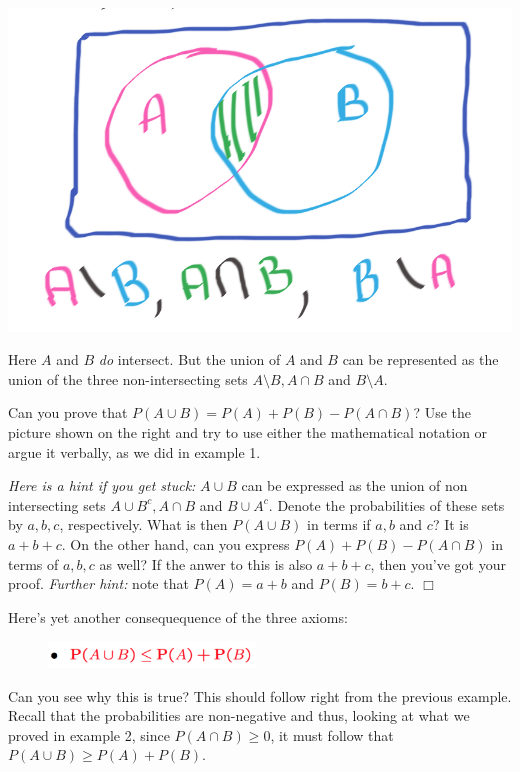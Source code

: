 \documentclass{tufte-handout}
\begin{document}
\begin{marginfigure}
  \includegraphics{AintersectsB}
  \caption{Here $A$ and $B$ \textit{do} intersect. But the union of $A$ and $B$ can be represented as the union of the three non-intersecting sets $A \setminus B, A \cap B$ and $B \setminus A$.}
\end{marginfigure}


Can you prove that $P(A \cup B) = P(A) + P(B) - P(A \cap B)$? Use the picture shown on the right and try to use either the mathematical notation or argue it verbally, as we did in example 1.

\vspace{0.2cm}
\textit{Here is a hint if you get stuck:} $A \cup B$ can be expressed as the union of non intersecting sets $A\cup B^c, A \cap B$ and $B \cup A^c$. Denote the probabilities of these sets by $a, b, c$, respectively. What is then $P(A \cup B)$ in terms if $a, b$ and $c$? It is $a + b +c$. On the other hand, can you express $P(A) + P(B) - P(A \cap B)$ in terms of $a, b, c$ as well? If the anwer to this is also $a + b +c$, then you've got your proof. \textit{Further hint:}  note that $P(A) = a + b$ and $P(B) = b + c$.  $\Box$

 Here's yet another consequequence of the three axioms:

\begin{figure}
  \includegraphics[width=5.5cm]{Conseq3}
\end{figure}

Can you see why this is true? This should follow right from the previous example. Recall that the probabilities are non-negative and thus, looking at what we proved in example 2, since $P(A \cap B) \geq 0$, it must follow that $P(A \cup B) \geq P(A) + P(B)$. 
\end{document}
